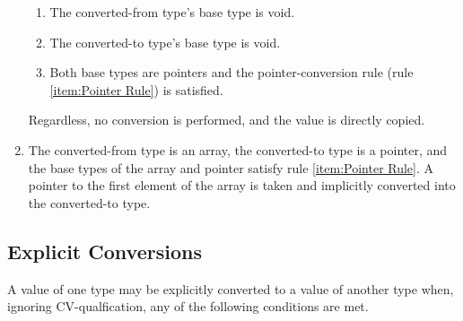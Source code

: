\documentclass[letterpaper,12pt]{book}
\begin{document}
\begin{enumerate}
\begin{enumerate}
		\item The converted-from type's base type is void.
		
		\item The converted-to type's base type is void.
		
		\item Both base types are pointers and the pointer-conversion rule (rule \ref{item:Pointer Rule}) is satisfied.
	\end{enumerate}
	
	Regardless, no conversion is performed, and the value is directly copied.
	
	\item The converted-from type is an array, the converted-to type is a pointer, and the base types of the array and pointer satisfy rule \ref{item:Pointer Rule}. A pointer to the first element of the array is taken and implicitly converted into the converted-to type.
\end{enumerate}

\subsection{Explicit Conversions}\label{subsection:Explicit Conversions}

A value of one type may be explicitly converted to a value of another type when, ignoring CV-qualfication, any of the following conditions are met.
\end{document}
